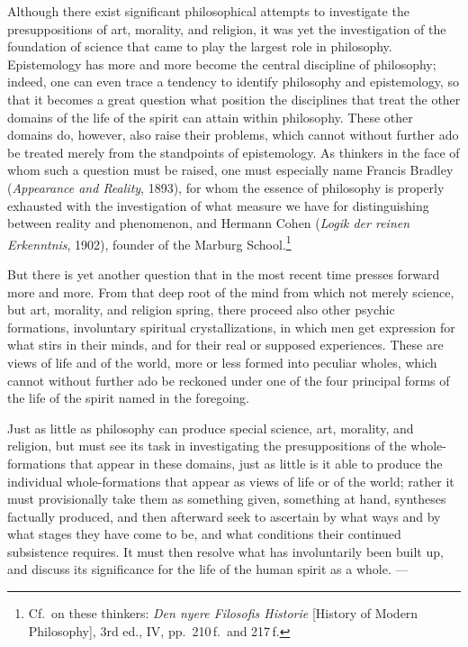 \documentclass[12pt]{book}
\newcommand{\opage}[1]{\marginnote{\footnotesize\textit{[#1]}}}
\begin{document}
Although there exist significant philosophical attempts to investigate the presuppositions of
art, morality, and religion, it was yet the investigation of the foundation of science that
came to play the largest role in philosophy. Epistemology has more and more become the central
discipline of philosophy; indeed, one can even trace a tendency to identify philosophy and
epistemology, so that it becomes a great question what position the disciplines that treat the
other domains of the life of the spirit can attain within philosophy. These other domains do, however,
also raise their problems, which cannot without further ado be treated merely from the
standpoints of epistemology. As thinkers in the face of whom such a question must be raised, one
must especially name Francis Bradley (\textit{Appearance and Reality}, 1893), for whom the
essence of philosophy is properly exhausted with the investigation of what measure we have for
distinguishing between reality and phenomenon, and Hermann Cohen (\textit{Logik der reinen
Erkenntnis}, 1902), founder of the Marburg School.\footnote{Cf.\ on these thinkers: \textit{Den
nyere Filosofis Historie} [History of Modern Philosophy], 3rd ed., IV, pp.\ 210\,f.\ and
217\,f.}

But there is yet another question that in the most recent time presses forward more and more.
From that deep root of the mind from which not merely science, but art, morality, and religion
spring, there proceed also other psychic formations, involuntary spiritual crystallizations, in
which men get expression for what stirs in their minds, and for \opage{5}their real or supposed
experiences. These are views of life and of the world, more or less formed into peculiar
wholes, which cannot without further ado be reckoned under one of the four principal forms of
the life of the spirit named in the foregoing.

Just as little as philosophy can produce special science, art, morality, and religion, but must
see its task in investigating the presuppositions of the whole-formations that appear in these
domains, just as little is it able to produce the individual whole-formations that appear as
views of life or of the world; rather it must provisionally take them as something given,
something at hand, syntheses factually produced, and then afterward seek to ascertain by what
ways and by what stages they have come to be, and what conditions their continued subsistence
requires. It must then resolve what has involuntarily been built up, and discuss its
significance for the life of the human spirit as a whole. ---
\end{document}

